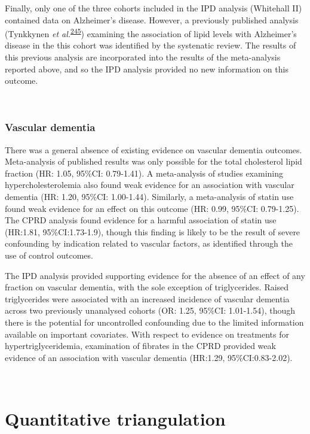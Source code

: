 \documentclass[a4paper, twoside]{templates/ociamthesis}
\begin{document}
Finally, only one of the three cohorts included in the IPD analysis (Whitehall II) contained data on Alzheimer's disease. However, a previously published analysis (Tynkkynen \emph{et al.}\textsuperscript{\protect\hyperlink{ref-tynkkynen2018}{245}}) examining the association of lipid levels with Alzheimer's disease in the this cohort was identified by the systenatic review. The results of this previous analysis are incorporated into the results of the meta-analysis reported above, and so the IPD analysis provided no new information on this outcome.

~

\hypertarget{vascular-dementia}{%
\subsubsection{Vascular dementia}\label{vascular-dementia}}

There was a general absence of existing evidence on vascular dementia outcomes. Meta-analysis of published results was only possible for the total cholesterol lipid fraction (HR: 1.05, 95\%CI: 0.79-1.41). A meta-analysis of studies examining hypercholesterolemia also found weak evidence for an association with vascular dementia (HR: 1.20, 95\%CI: 1.00-1.44). Similarly, a meta-analysis of statin use found weak evidence for an effect on this outcome (HR: 0.99, 95\%CI: 0.79-1.25). The CPRD analysis found evidence for a harmful association of statin use (HR:1.81, 95\%CI:1.73-1.9), though this finding is likely to be the result of severe confounding by indication related to vascular factors, as identified through the use of control outcomes.

The IPD analysis provided supporting evidence for the absence of an effect of any fraction on vascular dementia, with the sole exception of triglycerides. Raised triglycerides were associated with an increased incidence of vascular dementia across two previously unanalysed cohorts (OR: 1.25, 95\%CI: 1.01-1.54), though there is the potential for uncontrolled confounding due to the limited information available on important covariates. With respect to evidence on treatments for hypertriglyceridemia, examination of fibrates in the CPRD provided weak evidence of an association with vascular dementia (HR:1.29, 95\%CI:0.83-2.02).

~

\hypertarget{quantitative-triangulation}{%
\section{Quantitative triangulation}\label{quantitative-triangulation}}
\end{document}
